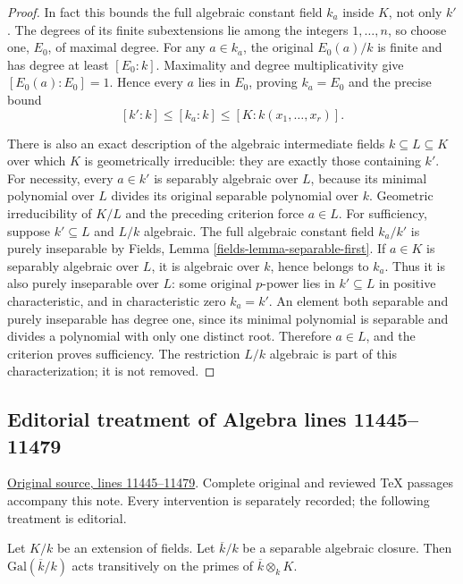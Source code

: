 \begin{proof}
In fact this bounds the full
algebraic constant field $k_a$
inside $K$, not only $k'$.
The degrees of its finite
subextensions lie among the
integers $1,\ldots,n$, so choose
one, $E_0$, of maximal degree.
For any $a\in k_a$, the original
$E_0(a)/k$ is finite and has
degree at least $[E_0:k]$.
Maximality and degree multiplicativity
give $[E_0(a):E_0]=1$. Hence every
$a$ lies in $E_0$, proving
$k_a=E_0$ and the precise bound
$$
[k':k]\leq[k_a:k]\leq[K:k(x_1,\ldots,x_r)].
$$

There is also an exact description
of the algebraic intermediate
fields $k\subseteq L\subseteq K$
over which $K$ is geometrically
irreducible: they are exactly
those containing $k'$.
For necessity, every $a\in k'$
is separably algebraic over $L$,
because its minimal polynomial
over $L$ divides its original
separable polynomial over $k$.
Geometric irreducibility of $K/L$
and the preceding criterion force
$a\in L$. For sufficiency, suppose
$k'\subseteq L$ and $L/k$ algebraic.
The full algebraic constant field
$k_a/k'$ is purely inseparable
by Fields, Lemma
\ref{fields-lemma-separable-first}.
If $a\in K$ is separably algebraic
over $L$, it is algebraic over
$k$, hence belongs to $k_a$.
Thus it is also purely inseparable
over $L$: some original $p$-power
lies in $k'\subseteq L$ in positive
characteristic, and in characteristic
zero $k_a=k'$. An element both
separable and purely inseparable
has degree one, since its minimal
polynomial is separable and divides
a polynomial with only one distinct
root. Therefore $a\in L$, and the
criterion proves sufficiency.
The restriction $L/k$ algebraic
is part of this characterization;
it is not removed.
\end{proof}


\subsection{Editorial treatment of Algebra lines 11445--11479}

\hypertarget{algebra-context-148}{}

\noindent\href{https://github.com/stacks/stacks-project/blob/a04446e57ec1fbc252a871afcec7752fb2807b14/algebra.tex\#L11445}{Original source, lines 11445--11479}. Complete original and reviewed TeX passages accompany this note. Every intervention is separately recorded; the following treatment is editorial.


\begin{lemma}
\label{editorial-source-lemma-Galois-orbit}
Let $K/k$ be an extension of fields.
Let $\overline{k}/k$ be a separable algebraic closure.
Then $\text{Gal}(\overline{k}/k)$ acts transitively on the
primes of $\overline{k} \otimes_k K$.
\end{lemma}

